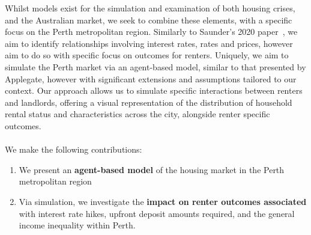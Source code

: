 \documentclass[11pt]{article}
\begin{document}
Whilst models exist for the simulation and examination of both housing
crises, and the Australian market, we seek to combine these elements, with
a specific focus on the Perth metropolitan region. Similarly to Saunder's
2020 paper~\cite{saunders2020model}, we aim to identify relationships involving interest rates,
rates and prices, however aim to do so with specific focus on outcomes
for renters. Uniquely, we aim to simulate the Perth market via an
agent-based model, similar to that presented by Applegate, however
with significant extensions and assumptions tailored to our context.
Our approach allows us to simulate specific interactions between renters and
landlords, offering a visual representation of the distribution of
household rental status and characteristics across the city, alongside
renter specific outcomes.
\\
\\
We make the following contributions:
\begin{enumerate}
    \item We present an \textbf{agent-based model} of the housing market in the
    Perth metropolitan region
    \item Via simulation, we investigate the \textbf{impact on renter outcomes
    associated} with interest rate hikes, upfront deposit amounts 
    required, and the general income inequality within Perth.
\end{enumerate}



\end{document}
